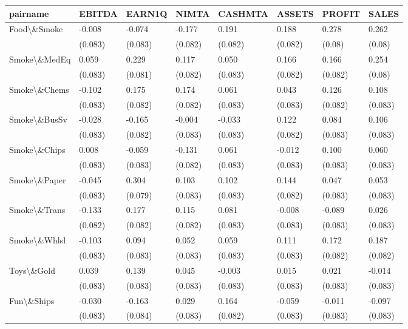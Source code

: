 
\begin{tabular}{l|l|l|l|l|l|l|l}
\hline
pairname & EBITDA & EARN1Q & NIMTA & CASHMTA & ASSETS & PROFIT & SALES\\
\hline
Food\textbackslash{}\&Smoke & -0.008 & -0.074 & -0.177 & 0.191 & 0.188 & 0.278 & 0.262\\
 & (0.083) & (0.083) & (0.082) & (0.082) & (0.082) & (0.08) & (0.08)\\
Smoke\textbackslash{}\&MedEq & 0.059 & 0.229 & 0.117 & 0.050 & 0.166 & 0.166 & 0.254\\
 & (0.083) & (0.081) & (0.082) & (0.083) & (0.082) & (0.082) & (0.08)\\
Smoke\textbackslash{}\&Chems & -0.102 & 0.175 & 0.174 & 0.061 & 0.043 & 0.126 & 0.108\\
 & (0.083) & (0.082) & (0.082) & (0.083) & (0.083) & (0.082) & (0.083)\\
Smoke\textbackslash{}\&BusSv & -0.028 & -0.165 & -0.004 & -0.033 & 0.122 & 0.084 & 0.106\\
 & (0.083) & (0.082) & (0.083) & (0.083) & (0.082) & (0.083) & (0.083)\\
Smoke\textbackslash{}\&Chips & 0.008 & -0.059 & -0.131 & 0.061 & -0.012 & 0.100 & 0.060\\
 & (0.083) & (0.083) & (0.082) & (0.083) & (0.083) & (0.083) & (0.083)\\
Smoke\textbackslash{}\&Paper & -0.045 & 0.304 & 0.103 & 0.102 & 0.144 & 0.047 & 0.053\\
 & (0.083) & (0.079) & (0.083) & (0.083) & (0.082) & (0.083) & (0.083)\\
Smoke\textbackslash{}\&Trans & -0.133 & 0.177 & 0.115 & 0.081 & -0.008 & -0.089 & 0.026\\
 & (0.082) & (0.082) & (0.082) & (0.083) & (0.083) & (0.083) & (0.083)\\
Smoke\textbackslash{}\&Whlsl & -0.103 & 0.094 & 0.052 & 0.059 & 0.111 & 0.172 & 0.187\\
 & (0.083) & (0.083) & (0.083) & (0.083) & (0.083) & (0.082) & (0.082)\\
Toys\textbackslash{}\&Gold & 0.039 & 0.139 & 0.045 & -0.003 & 0.015 & 0.021 & -0.014\\
 & (0.083) & (0.083) & (0.083) & (0.083) & (0.083) & (0.083) & (0.083)\\
Fun\textbackslash{}\&Ships & -0.030 & -0.163 & 0.029 & 0.164 & -0.059 & -0.011 & -0.097\\
 & (0.083) & (0.084) & (0.083) & (0.082) & (0.083) & (0.083) & (0.083)\\

\end{tabular}
